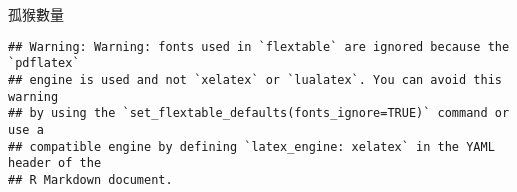 \documentclass[
]{article}
\begin{document}
\begin{longtable}[c]{ccccccccccccccccc}
\end{longtable}

\newpage

孤猴數量

\begin{verbatim}
## Warning: Warning: fonts used in `flextable` are ignored because the `pdflatex`
## engine is used and not `xelatex` or `lualatex`. You can avoid this warning
## by using the `set_flextable_defaults(fonts_ignore=TRUE)` command or use a
## compatible engine by defining `latex_engine: xelatex` in the YAML header of the
## R Markdown document.
\end{verbatim}

\providecommand{\docline}[3]{\noalign{\global\setlength{\arrayrulewidth}{#1}}\arrayrulecolor[HTML]{#2}\cline{#3}}

\setlength{\tabcolsep}{2pt}

\renewcommand*{\arraystretch}{1.5}
\end{document}
